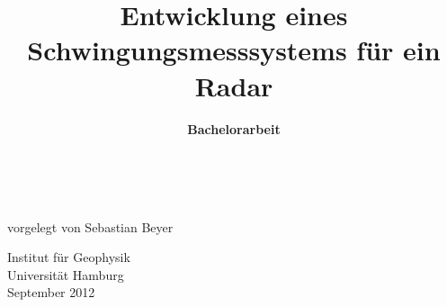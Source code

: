 \documentclass[12pt,a4paper,twoside,BCOR=12.5mm]{scrartcl}
\begin{document}
\title {Entwicklung eines Schwingungsmesssystems für ein Radar}
\author{\textbf{\large Bachelorarbeit}}
\date{~}

\maketitle
\thispagestyle{empty}

\begin{center}
vorgelegt von
Sebastian Beyer

\vspace{\baselineskip}
\vspace{\baselineskip}
\vspace{\baselineskip}
\vspace{\baselineskip}
\vspace{\baselineskip}
\vspace{\baselineskip}
\vspace{\baselineskip}
\vspace{\baselineskip}
\vspace{\baselineskip}
\vspace{\baselineskip}
\vspace{\baselineskip}
\vspace{\baselineskip}
\vspace{\baselineskip}
\vspace{\baselineskip}
\vspace{\baselineskip}
\vspace{\baselineskip}
\vspace{\baselineskip}
\vspace{\baselineskip}
\vspace{\baselineskip}
\vspace{\baselineskip}
\vspace{\baselineskip}

Institut für Geophysik\\
Universität Hamburg\\
\vspace{\baselineskip}
September 2012
\end{center}



\cleardoublepage
\newpage
~
\vspace{\baselineskip}
\vspace{\baselineskip}
\vspace{\baselineskip}
\vspace{\baselineskip}
\vspace{\baselineskip}
\vspace{\baselineskip}
\vspace{\baselineskip}
\vspace{\baselineskip}
\end{document}
